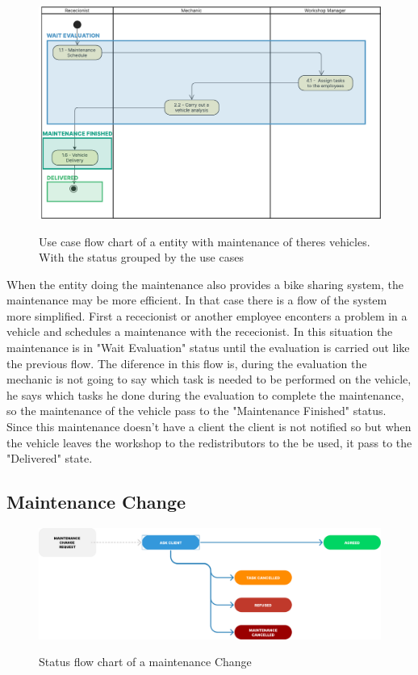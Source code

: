 \begin{figure}[h]
  \caption{Use case flow chart of a entity with maintenance of theres vehicles. With the status grouped by the use cases}
  \centering
  \includegraphics[width=\textwidth]{figs/Status/Maintenance/EntityDiagram}
  \label{fig:figure2}
\end{figure}

When the entity doing the maintenance also provides a bike sharing system, the maintenance may be more efficient.
In that case there is a flow of the system more simplified.
First a rececionist or another employee enconters a problem in a vehicle and schedules a maintenance with the rececionist. In this situation the maintenance is in "Wait Evaluation" status until the evaluation is carried out like the previous flow.
The diference in this flow is, during the evaluation the mechanic is not going to say which task is needed to be performed on the vehicle, he says which tasks he done during the evaluation to complete the maintenance, so the maintenance of the vehicle pass to the "Maintenance Finished" status.
Since this maintenance doesn't have a client the client is not notified so but when the vehicle leaves the workshop to the redistributors to the be used, it pass to the "Delivered" state.  


\subsection{Maintenance Change} 


\begin{figure}[h]
  \caption{Status flow chart of a maintenance Change}
  \centering
  \includegraphics[width=\textwidth]{figs/Status/MaintenanceChange/StatusDiagram}
  \label{fig:figure2}
\end{figure}


